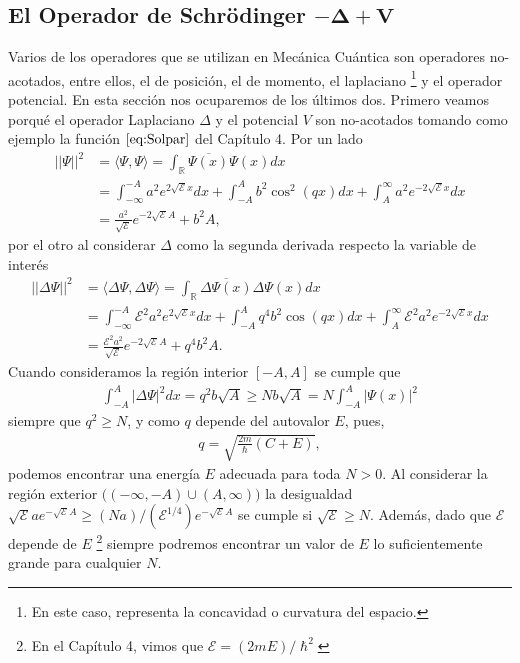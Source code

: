 \documentclass[12pt]{article}
\theoremstyle{definition}
\newcommand*{\field}[1]{\mathbb{#1}}
\begin{document}
\subsection{El Operador de Schrödinger $\boldsymbol{-\Delta + V}$}
\noindent
Varios de los operadores que se utilizan en Mecánica Cuántica son operadores no-acotados, entre ellos, el de posición, el de momento, el laplaciano \footnote{En este caso, representa la concavidad o curvatura del espacio.} y el operador potencial. En esta sección nos ocuparemos de los últimos dos. Primero veamos porqué el operador Laplaciano $\Delta$ y el potencial $V$ son no-acotados tomando como ejemplo la función $\eqref{eq:Solpar}$ del Capítulo 4. Por un lado
\begin{align*}
    ||\Psi||^2 & =
    \langle\Psi,\Psi\rangle =
    \int_{\field{R}} \overline{\Psi(x)}\Psi(x)dx \\
    & = \int_{-\infty}^{-A}a^2e^{2\sqrt{\mathcal{E}}x}dx + 
    \int_{-A}^{A}b^2\cos^2(qx)dx +
    \int_{A}^{\infty}a^2e^{-2\sqrt{\mathcal{E}}x}dx
    \\
    & =
    \frac{a^2}{\sqrt{\mathcal{E}}}e^{-2\sqrt{\mathcal{E}}A} + b^2A,
\end{align*}
por el otro al considerar $\Delta$ como la segunda derivada respecto la variable de interés
\begin{align*}
    ||\Delta\Psi||^2 & = \langle\Delta\Psi,\Delta\Psi\rangle = \int_{\field{R}}\overline{\Delta\Psi(x)}\Delta\Psi(x)dx
    \\
    & = \int_{-\infty}^{-A}\mathcal{E}^2a^2e^{2\sqrt{\mathcal{E}}x}dx + 
    \int_{-A}^{A}q^4b^2\cos(qx)dx +
    \int_{A}^{\infty}\mathcal{E}^2a^2e^{-2\sqrt{\mathcal{E}}x}dx
    \\
    & = \frac{\mathcal{E}^2a^2}{\sqrt{\mathcal{E}}}e^{-2\sqrt{\mathcal{E}}A} + q^4b^2A.
\end{align*}
Cuando consideramos la región interior $[-A,A]$ se cumple que
\begin{align*}
    \int_{-A}^{A} |\Delta\Psi|^2 dx= q^2b\sqrt{A} \geq Nb\sqrt{A} = N\int_{-A}^{A}|\Psi(x)|^2
\end{align*}
 siempre que $q^2\geq N$, y como $q$ depende del autovalor $E$, pues,
\begin{align*}
    q = \sqrt{\frac{2m}{\hslash}(C+E)},
\end{align*}
podemos encontrar una energía $E$ adecuada para toda $N>0$. Al considerar la región exterior $\big( (-\infty,-A)\cup(A,\infty)\big)$ la desigualdad $\sqrt{\mathcal{E}}ae^{-\sqrt{\mathcal{E}}A}\geq (Na)/(\mathcal{E}^{1/4})e^{-\sqrt{\mathcal{E}}A}$ se cumple si $\sqrt{\mathcal{E}}\geq N$. Además, dado que $\mathcal{E}$ depende de $E$ \footnote{En el Capítulo 4, vimos que $\mathcal{E} = (2mE)/\hslash^2$} siempre podremos encontrar un valor de $E$ lo suficientemente grande para cualquier $N$.
\end{document}
